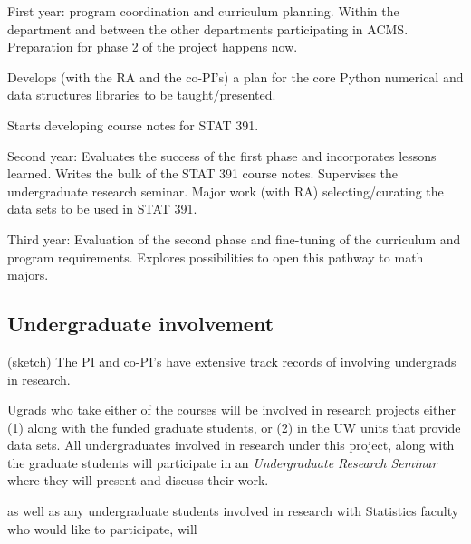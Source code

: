 \bit
\item First year: program coordination and curriculum planning. Within the department and between the other departments participating in ACMS. Preparation for phase 2 of the project happens now. 

Develops (with the RA and the co-PI's) a plan for the core Python numerical and data structures libraries to be taught/presented. 

Starts developing course notes for STAT 391. 

\item Second year: Evaluates the success of the first phase and
  incorporates lessons learned. Writes the bulk of the STAT 391 course
  notes. Supervises the undergraduate research seminar. Major work (with RA) 
  selecting/curating the data sets to be used in STAT 391.

\item Third year: Evaluation of the second phase and fine-tuning of
  the curriculum and program requirements. Explores possibilities to
  open this pathway to math majors.
 \eit

\subsection{Undergraduate involvement}

(sketch)
The PI and co-PI's have extensive track records of involving
undergrads in research. 

Ugrads who take either of the courses will be involved in research
projects either (1) along with the funded graduate students, or (2) in
the UW units that provide data sets. All undergraduates involved in
research under this project, along with the graduate students will
participate in an {\em Undergraduate Research Seminar} where they will
present and discuss their work. 

as well as any undergraduate students
involved in research with Statistics faculty who would like to
participate, will
